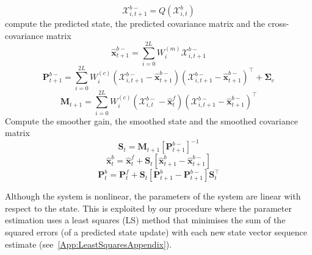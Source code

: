 \documentclass[twocolumn,11pt,a4paper]{article}		%
\begin{document}
\begin{algorithm}
\begin{small}
\begin{algorithmic}[1]
		\begin{equation*}
			\mathcal X_{i,t+1}^{b-}=Q(\mathcal X_{i,t}^b) 
		\end{equation*}
		 compute the predicted state, the predicted covariance matrix and the cross-covariance matrix
		\begin{equation*}
			\hat{\mathbf x}_{t+1}^{b-}=\sum_{i=0}^{2L} W_i^{(m)}\mathcal X_{i,t+1}^{b-} 
		\end{equation*}
		\begin{equation*}
			\mathbf P_{t +1}^{b-}=\sum_{i=0}^{2L} W_i^{(c)}(\mathcal X_{i,t+1}^{b-}-\hat{\mathbf x}_{t +1}^{b-})(\mathcal X_{i,t+1}^{b-}-\hat{\mathbf x}_{t +1}^{b-})^\top+\boldsymbol \Sigma_e 
		\end{equation*}
		\begin{equation*}
			\mathbf M_{t +1}=\sum_{i=0}^{2L} W_i^{(c)}(\mathcal X_{i,t}^{b-}-\hat{\mathbf x}_{t}^{f})(\mathcal X_{i,t+1}^{b-}-\hat{\mathbf x}_{t+1}^{b-})^\top 
		\end{equation*}
		 Compute the smoother gain, the smoothed state and the smoothed covariance matrix
		\begin{equation*}
			\mathbf S_t=\mathbf M_{t +1}\left[ \mathbf P_{t +1}^{b-}\right] ^{-1} 
		\end{equation*}
		\begin{equation*}
			\hat{\mathbf x}_t^b=\hat{\mathbf x}_t^f+\mathbf S_t\left[\hat{\mathbf x}_{t+1}^{b}-\hat{\mathbf x}_{t+1}^{b-}\right] 
		\end{equation*}
		\begin{equation*}
			\mathbf P_{t}^{b}=\mathbf P_{t}^{f}+\mathbf S_t\left[\mathbf P_{t+1}^{b}-\mathbf P_{t+1}^{b-} \right]\mathbf S_t^\top 
		\end{equation*}
	\end{algorithmic}
\end{small}
\end{algorithm}

Although the system is nonlinear, the parameters of the system are linear with respect to the state. This is exploited by our procedure where the parameter estimation uses a least squares (LS) method that minimises the sum of the squared errors (of a predicted state update) with each new state vector sequence estimate (see~\ref{App:LeastSquaresAppendix}).
\end{document}
